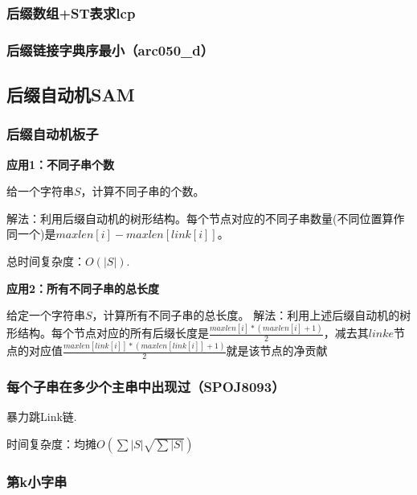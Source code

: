 \documentclass[landscape,twocolumn,twoside,a4paper]{article}
\begin{document}
\subsubsection{后缀数组+ST表求lcp}


\subsubsection{后缀链接字典序最小（arc050\_d）}


\subsection{后缀自动机SAM}

\subsubsection{后缀自动机板子}
\textbf{应用1：不同子串个数}\par
给一个字符串$S$，计算不同子串的个数。\par
解法：利用后缀自动机的树形结构。每个节点对应的不同子串数量(不同位置算作同一个)是$maxlen[i]-maxlen[link[i]]$。\par
总时间复杂度：$O(|S|)$.\par
\textbf{应用2：所有不同子串的总长度}\par
给定一个字符串$S$，计算所有不同子串的总长度。
解法：利用上述后缀自动机的树形结构。每个节点对应的所有后缀长度是$\frac{maxlen[i]\ast (maxlen[i]+1)}{2}$，减去其$linke$节点的对应值$\frac{maxlen[link[i]]\ast (maxlen[link[i]]+1)}{2}$就是该节点的净贡献


\subsubsection{每个子串在多少个主串中出现过（SPOJ8093）}
暴力跳Link链.\par
时间复杂度：$均摊O(\sum |S|\sqrt{\sum |S|})$


\subsubsection{第k小字串}

\end{document}
